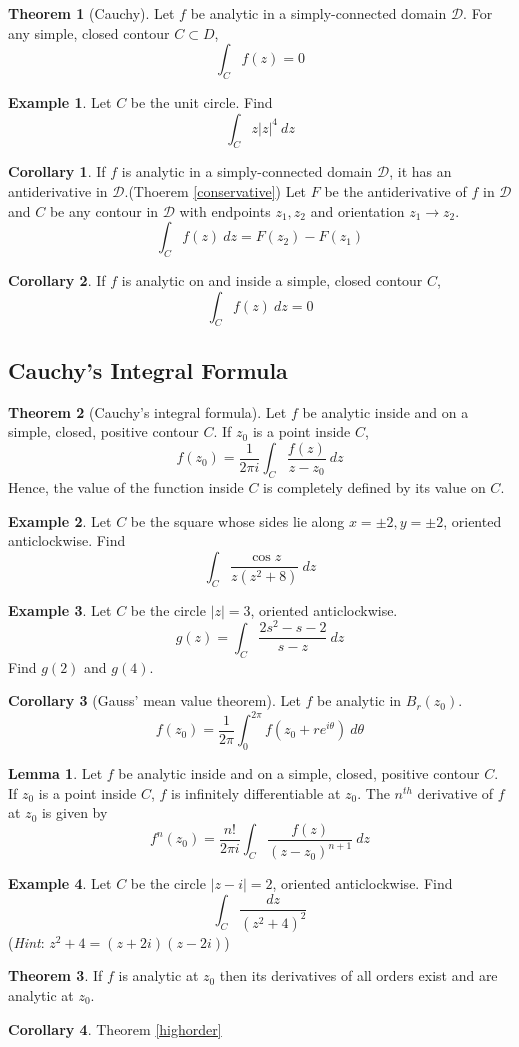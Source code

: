 \documentclass[10pt, a4paper]{extarticle}
\theoremstyle{definition}
\newtheorem{thm}{Theorem}
\newtheorem{lem}{Lemma}[thm]
\newtheorem{cor}{Corollary}[thm]
\newtheorem{eg}{Example}
\begin{document}
	\begin{thm}[Cauchy]
		Let $f$ be analytic in a simply-connected domain $\mathscr{D}$. For any simple, closed contour $C\subset D$,
		\[\int_Cf(z)=0\]
	\end{thm}
	\begin{eg}
		Let $C$ be the unit circle. Find
		\[\int_C z|z|^4\ dz\]
	\end{eg}
	\begin{cor}
		If $f$ is analytic in a simply-connected domain $\mathscr{D}$, it has an antiderivative in $\mathscr{D}$.(Thoerem \ref{conservative})
		Let $F$ be the antiderivative of $f$ in $\mathscr{D}$ and $C$ be any contour in $\mathscr{D}$ with endpoints $z_1,z_2$ and orientation $z_1\to z_2$.
		\[\int_Cf(z)\ dz=F(z_2)-F(z_1)\]
	\end{cor}
	\begin{cor}
		If $f$ is analytic on and inside a simple, closed contour $C$,
		\[\int_C f(z)\ dz=0\]
	\end{cor}
	
	\subsection{Cauchy's Integral Formula}
	\begin{thm}[Cauchy's integral formula]
		Let $f$ be analytic inside and on a simple, closed, positive contour $C$. If $z_0$ is a point inside $C$,
		\[f(z_0)=\frac{1}{2\pi i}\int_C\frac{f(z)}{z-z_0}\ dz\]
		Hence, the value of the function inside $C$ is completely defined by its value on $C$. 
	\end{thm}
	\begin{eg}
		Let $C$ be the square whose sides lie along $x=\pm2,y=\pm2$, oriented anticlockwise. Find
		\[\int_C\frac{\cos z}{z(z^2+8)}\ dz\]
	\end{eg}
	\begin{eg}
		Let $C$ be the circle $|z|=3$, oriented anticlockwise.
		\[g(z)=\int_C\frac{2s^2-s-2}{s-z}\ dz\]
		Find $g(2)$ and $g(4)$.
	\end{eg}
	\begin{cor}[Gauss' mean value theorem]
		Let $f$ be analytic in $B_r(z_0)$.
		\[f(z_0)=\frac{1}{2\pi}\int_{0}^{2\pi}f(z_0+re^{i\theta})\ d\theta\]
	\end{cor}
	\begin{lem}
		Let $f$ be analytic inside and on a simple, closed, positive contour $C$. If $z_0$ is a point inside $C$, $f$ is infinitely differentiable at $z_0$. The $n^{th}$ derivative of $f$ at $z_0$ is given by
		\[f^{n}(z_0)=\frac{n!}{2\pi i}\int_C\frac{f(z)}{(z-z_0)^{n+1}}\ dz\tag*{($n=1,2,\cdots$)}\]
	\end{lem}
	\begin{eg}
		Let $C$ be the circle $|z-i|=2$, oriented anticlockwise. Find
		\[\int_C \frac{dz}{(z^2+4)^2}\]
		(\textit{Hint}: $z^2+4=(z+2i)(z-2i)$)
	\end{eg}
	\begin{thm}
		If $f$ is analytic at $z_0$ then its derivatives of all orders exist and are analytic at $z_0$.
	\end{thm}
	\begin{cor}
		Theorem \ref{highorder}
	\end{cor}
\end{document}
